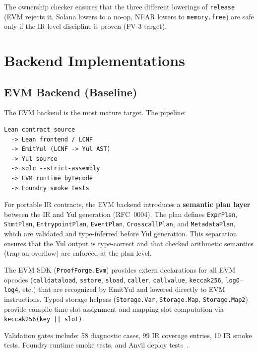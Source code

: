 \documentclass[sigconf]{acmart}
\begin{document}
The ownership checker ensures that the three different lowerings of \texttt{release}
(EVM rejects it, Solana lowers to a no-op, NEAR lowers to \texttt{memory.free}) are safe
only if the IR-level discipline is proven (FV-3 target).

\section{Backend Implementations}
\label{sec:backends}

\subsection{EVM Backend (Baseline)}

The EVM backend is the most mature target. The pipeline:

\begin{lstlisting}[style=textcode]
Lean contract source
  -> Lean frontend / LCNF
  -> EmitYul (LCNF -> Yul AST)
  -> Yul source
  -> solc --strict-assembly
  -> EVM runtime bytecode
  -> Foundry smoke tests
\end{lstlisting}

For portable IR contracts, the EVM backend introduces a \textbf{semantic plan layer} between
the IR and Yul generation (RFC~0004). The plan defines \texttt{ExprPlan}, \texttt{StmtPlan},
\texttt{EntrypointPlan}, \texttt{EventPlan}, \texttt{CrosscallPlan}, and \texttt{MetadataPlan},
which are validated and type-inferred before Yul generation. This separation ensures that the
Yul output is type-correct and that checked arithmetic semantics (trap on overflow) are
enforced at the plan level.

The EVM SDK (\texttt{ProofForge.Evm}) provides extern declarations for all EVM opcodes
(\texttt{calldataload}, \texttt{sstore}, \texttt{sload}, \texttt{caller}, \texttt{callvalue},
\texttt{keccak256}, \texttt{log0}--\texttt{log4}, etc.) that are recognized by EmitYul and lowered
directly to EVM instructions. Typed storage helpers (\texttt{Storage.Var}, \texttt{Storage.Map},
\texttt{Storage.Map2}) provide compile-time slot assignment and mapping slot computation via
\texttt{keccak256(key || slot)}.

Validation gates include: 58 diagnostic cases, 99 IR coverage entries, 19 IR smoke tests,
Foundry runtime smoke tests, and Anvil deploy tests~\cite{foundry}.
\end{document}
